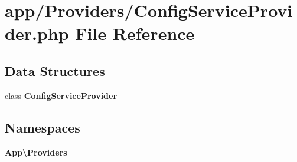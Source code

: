 \section{app/\+Providers/\+Config\+Service\+Provider.php File Reference}
\label{_config_service_provider_8php}
\subsection*{Data Structures}
\begin{DoxyCompactItemize}
\item 
class {\bf Config\+Service\+Provider}
\end{DoxyCompactItemize}
\subsection*{Namespaces}
\begin{DoxyCompactItemize}
\item 
 {\bf App\textbackslash{}\+Providers}
\end{DoxyCompactItemize}
